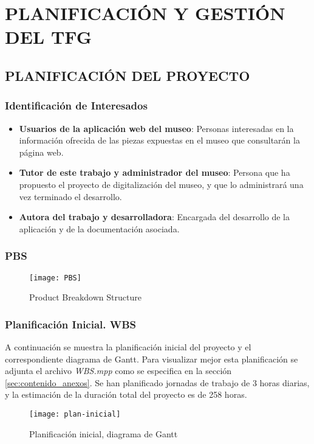 \newpage
\chapter{PLANIFICACIÓN Y GESTIÓN DEL TFG}
\newpage

\newpage
\section{PLANIFICACIÓN DEL PROYECTO}

\subsection{Identificación de Interesados}
\begin{itemize}
\item \textbf{Usuarios de la aplicación web del museo}: Personas interesadas en la información ofrecida de las piezas expuestas en el museo que consultarán la página web.
\item \textbf{Tutor de este trabajo y administrador del museo}: Persona que ha propuesto el proyecto de digitalización del museo, y que lo administrará una vez terminado el desarrollo.
\item \textbf{Autora del trabajo y desarrolladora}: Encargada del desarrollo de la aplicación y de la documentación asociada.
\end{itemize}


\subsection{%
PBS}
\begin{figure}[H]
\centering
\centerline{\texttt{[image: PBS]}}
\caption{Product Breakdown Structure}
\end{figure}


\subsection{Planificación Inicial. WBS}
A continuación se muestra la planificación inicial del proyecto y el correspondiente diagrama de Gantt. Para visualizar mejor esta planificación se adjunta el archivo \textit{WBS.mpp} como se especifica en la sección \ref{sec:contenido_anexos}. Se han planificado jornadas de trabajo de 3 horas diarias, y la estimación de la duración total del proyecto es de 258 horas.
\begin{landscape}
\pagestyle{empty}
\begin{figure}[H]
\centering
\centerline{\texttt{[image: plan-inicial]}}
\caption{Planificación inicial, diagrama de Gantt}
\end{figure}

\end{landscape}
\pagestyle{fancy}
